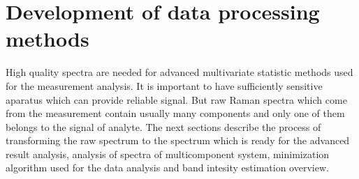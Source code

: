 \section{Development of data processing methods}
\label{data_processing}

High quality spectra are needed for advanced multivariate statistic methods
used for the measurement analysis.
It is important to have sufficiently sensitive aparatus which can provide
reliable signal.
But raw Raman spectra which come from the measurement contain usually many
components and only one of them belongs to the signal of analyte.
The next sections describe the process of transforming the raw spectrum
to the spectrum which is ready for the advanced result analysis, analysis
of spectra of multicomponent system, minimization algorithm used for the
data analysis and band intesity estimation overview.







